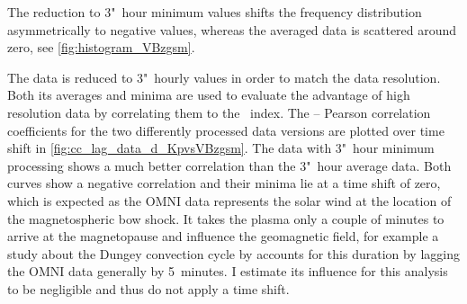 The reduction to 3"~hour minimum values shifts the \vBz{} frequency distribution asymmetrically to negative values, whereas the averaged data is scattered around zero, see \autoref{fig:histogram_VBzgsm}.
\begin{figure}[htb]
	\begin{floatrow}
	\end{floatrow}
\end{figure}

The data is reduced to 3"~hourly values in order to match the \Kp{} data resolution. Both its averages and minima are used to evaluate the advantage of high resolution data by correlating them to the \Kp~index. The \Kp{}--\vBz{} Pearson correlation coefficients for the two differently processed data versions are plotted over time shift in \autoref{fig:cc_lag_data_d_KpvsVBzgsm}. The data with 3"~hour minimum processing shows a much better correlation than the 3"~hour average data. Both curves show a negative correlation and their minima lie at a time shift of zero, which is expected as the OMNI data represents the solar wind at the location of the magnetospheric bow shock. It takes the plasma only a couple of minutes to arrive at the magnetopause and influence the geomagnetic field, for example a study about the Dungey convection cycle by \citet{Zhang2015} accounts for this duration by lagging the OMNI data generally by 5~minutes. I estimate its influence for this analysis to be negligible and thus do not apply a time shift.

